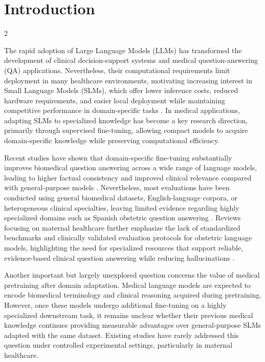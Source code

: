 \documentclass[11pt]{article}
\begin{document}
\section{Introduction}
\begin{multicols}{2}
\raggedright

The rapid adoption of Large Language Models (LLMs) has transformed the development of clinical decision-support systems and medical question-answering (QA) applications. Nevertheless, their computational requirements limit deployment in many healthcare environments, motivating increasing interest in Small Language Models (SLMs), which offer lower inference costs, reduced hardware requirements, and easier local deployment while maintaining competitive performance in domain-specific tasks \cite{Pingua2025MedicalLLMs}. In medical applications, adapting SLMs to specialized knowledge has become a key research direction, primarily through supervised fine-tuning, allowing compact models to acquire domain-specific knowledge while preserving computational efficiency.

Recent studies have shown that domain-specific fine-tuning substantially improves biomedical question answering across a wide range of language models, leading to higher factual consistency and improved clinical relevance compared with general-purpose models \cite{Bora2025BiomedicalQA}. Nevertheless, most evaluations have been conducted using general biomedical datasets, English-language corpora, or heterogeneous clinical specialties, leaving limited evidence regarding highly specialized domains such as Spanish obstetric question answering \cite{Arzideh2026ClinicalEmbedding}. Reviews focusing on maternal healthcare further emphasize the lack of standardized benchmarks and clinically validated evaluation protocols for obstetric language models, highlighting the need for specialized resources that support reliable, evidence-based clinical question answering while reducing hallucinations \cite{BioMedInformatics2025MaternalRAG,Psilopatis2026ObstetricLLM,PachecoRomero2023IA}.

Another important but largely unexplored question concerns the value of medical pretraining after domain adaptation. Medical language models are expected to encode biomedical terminology and clinical reasoning acquired during pretraining. However, once these models undergo additional fine-tuning on a highly specialized downstream task, it remains unclear whether their previous medical knowledge continues providing measurable advantages over general-purpose SLMs adapted with the same dataset. Existing studies have rarely addressed this question under controlled experimental settings, particularly in maternal healthcare.


\end{multicols}
\end{document}
